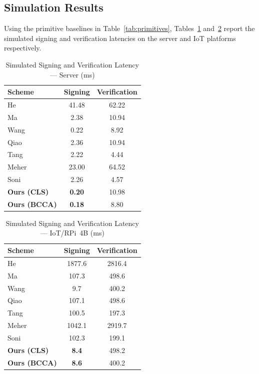 \documentclass[conference]{IEEEtran}
\begin{document}
\subsection{Simulation Results}

Using the primitive baselines in Table~\ref{tab:primitives}, Tables~\ref{tab:sim_server}
and~\ref{tab:sim_iot} report the simulated signing and verification latencies
on the server and IoT platforms respectively.

\begin{table}[htbp]
\centering
\caption{Simulated Signing and Verification Latency — Server (ms)}
\label{tab:sim_server}
\renewcommand{\arraystretch}{1.2}
\begin{tabular}{lcc}
\toprule
\textbf{Scheme} & \textbf{Signing} & \textbf{Verification} \\
\midrule
He~\cite{ref27}    & 41.48 & 62.22 \\
Ma~\cite{ref22}    &  2.38 & 10.94 \\
Wang~\cite{ref1}   &  0.22 &  8.92 \\
Qiao~\cite{ref24}  &  2.36 & 10.94 \\
Tang~\cite{ref25}  &  2.22 &  4.44 \\
Meher~\cite{ref28} & 23.00 & 64.52 \\
Soni~\cite{ref26}  &  2.26 &  4.57 \\
\midrule
\textbf{Ours (CLS)} & \textbf{0.20} & 10.98 \\
\textbf{Ours (BCCA)} & \textbf{0.18} & 8.80 \\
\bottomrule
\end{tabular}
\end{table}

\begin{table}[htbp]
\centering
\caption{Simulated Signing and Verification Latency — IoT/RPi~4B (ms)}
\label{tab:sim_iot}
\renewcommand{\arraystretch}{1.2}
\begin{tabular}{lcc}
\toprule
\textbf{Scheme} & \textbf{Signing} & \textbf{Verification} \\
\midrule
He~\cite{ref27}    & 1877.6 & 2816.4 \\
Ma~\cite{ref22}    &  107.3 &  498.6 \\
Wang~\cite{ref1}   &    9.7 &  400.2 \\
Qiao~\cite{ref24}  &  107.1 &  498.6 \\
Tang~\cite{ref25}  &  100.5 &  197.3 \\
Meher~\cite{ref28} & 1042.1 & 2919.7 \\
Soni~\cite{ref26}  &  102.3 &  199.1 \\
\midrule
\textbf{Ours (CLS)}  & \textbf{8.4} & 498.2 \\
\textbf{Ours (BCCA)} & \textbf{8.6} & 400.2 \\
\bottomrule
\end{tabular}
\end{table}
\end{document}
